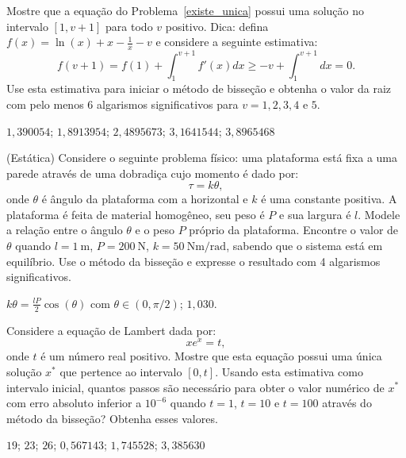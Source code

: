 \begin{ex}
\begin{exer} Mostre que a equação do Problema~\ref{existe_unica} possui uma solução no intervalo $[1, v+1]$ para todo $v$ positivo. Dica: defina $f(x)=\ln(x)+x-\frac{1}{x}-v$  e considere a seguinte estimativa:
  \begin{equation}
    f(v+1)=f(1)+\int_1^{v+1}f'(x)dx\geq -v+\int_1^{v+1}dx=0.
  \end{equation}
Use esta estimativa para iniciar o método de bisseção e obtenha o valor da raiz com pelo menos 6 algarismos significativos para $v=1, 2, 3, 4$ e $5$.
\end{exer}
\begin{resp}
    $1,390054$; $1,8913954$; $2,4895673$; $3,1641544$; $3,8965468$
\end{resp}

\begin{exer}(Estática) Considere o seguinte problema físico: uma plataforma está fixa a uma parede através de uma dobradiça cujo momento é dado por:
  \begin{equation}
    \tau=k\theta,
  \end{equation}
onde $\theta$ é ângulo da plataforma com a horizontal e $k$ é uma constante positiva. A plataforma é feita de material homogêneo, seu peso é $P$ e sua largura é $l$. Modele a relação entre o ângulo $\theta$ e o peso $P$ próprio da plataforma. Encontre o valor de $\theta$ quando $l=1~\mbox{m}$, $P=200~\mbox{N}$, $k=50~\mbox{Nm}/\mbox{rad}$, sabendo que o sistema está em equilíbrio. Use o método da bisseção e expresse o resultado com 4 algarismos significativos.
\end{exer}
\begin{resp}
    $k\theta=\frac{lP}{2}\cos(\theta)$ com $\theta\in (0, \pi/2)$; $1,030$.
\end{resp}


\begin{exer} Considere a equação de Lambert dada por:
  \begin{equation}
    xe^x= t,
  \end{equation}
onde $t$ é um número real positivo. Mostre que esta equação possui uma única solução $x^*$ que pertence ao intervalo $[0, t]$. Usando esta estimativa como intervalo inicial, quantos passos são necessário para obter o valor numérico de $x^*$ com erro absoluto inferior a $10^{-6}$ quando $t=1$, $t=10$ e $t=100$ através do método da bisseção? Obtenha esses valores.
\end{exer}
\begin{resp}
    $19$; $23$; $26$; $0,567143$; $1,745528$; $3,385630$
\end{resp}


\end{ex}

